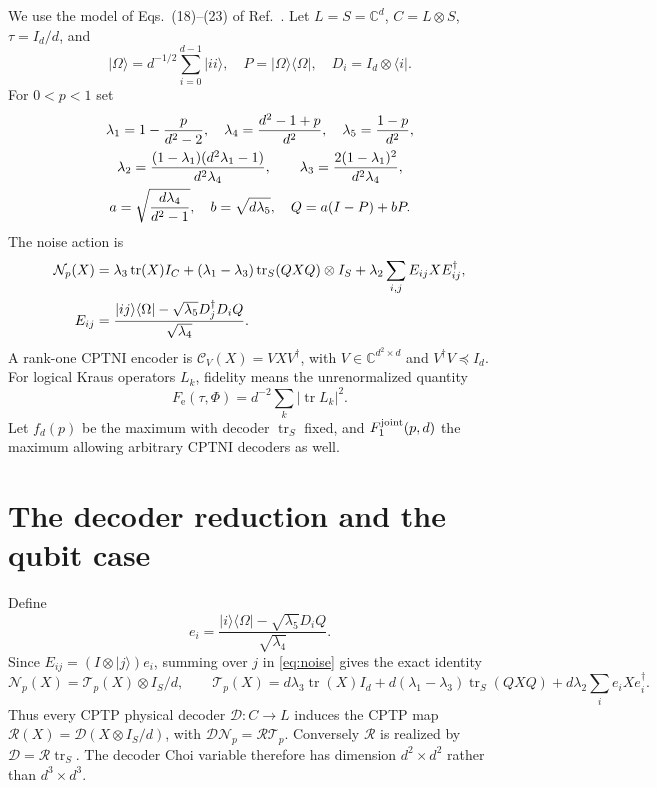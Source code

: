 \documentclass[11pt]{article}
\newcommand{\tr}{\operatorname{tr}}
\newcommand{\ket}[1]{\lvert#1\rangle}
\newcommand{\bra}[1]{\langle#1\rvert}
\newcommand{\N}{\mathcal N}
\newcommand{\T}{\mathcal T}
\newcommand{\R}{\mathcal R}
\newcommand{\C}{\mathcal C}
\newcommand{\F}{F_{\mathrm e}}
\begin{document}
We use the model of Eqs.~(18)--(23) of Ref.~\cite{LiJiang}. Let
$L=S=\mathbb C^d$, $C=L\otimes S$, $\tau=I_d/d$, and
\[
 \ket\Omega=d^{-1/2}\sum_{i=0}^{d-1}\ket{ii},\quad
 P=\ket\Omega\bra\Omega,\quad D_i=I_d\otimes\bra i.
\]
For $0<p<1$ set
\begin{gather}
 \lambda_1=1-\frac p{d^2-2},\quad
 \lambda_4=\frac{d^2-1+p}{d^2},\quad\lambda_5=\frac{1-p}{d^2},\notag\\
 \lambda_2=\frac{(1-\lambda_1)(d^2\lambda_1-1)}{d^2\lambda_4},\qquad
 \lambda_3=\frac{2(1-\lambda_1)^2}{d^2\lambda_4},\notag\\
 a=\sqrt{\frac{d\lambda_4}{d^2-1}},\quad b=\sqrt{d\lambda_5},\quad
 Q=a(I-P)+bP.\label{eq:parameters}
\end{gather}
The noise action is
\begin{align}
 \N_p(X)&=\lambda_3\tr(X)I_C+
 (\lambda_1-\lambda_3)\tr_S(QXQ)\otimes I_S
 +\lambda_2\sum_{i,j}E_{ij}XE_{ij}^\dagger,\label{eq:noise}\\
 E_{ij}&=\frac{\ket{ij}\bra\Omega-\sqrt{\lambda_5}D_j^\dagger D_iQ}
 {\sqrt{\lambda_4}}.\notag
\end{align}
A rank-one CPTNI encoder is $\C_V(X)=VXV^\dagger$, with
$V\in\mathbb C^{d^2\times d}$ and $V^\dagger V\preceq I_d$.
For logical Kraus operators $L_k$, fidelity means the unrenormalized quantity
\begin{equation}\label{eq:fidelity}
 \F(\tau,\Phi)=d^{-2}\sum_k|\tr L_k|^2.
\end{equation}
Let $f_d(p)$ be the maximum with decoder $\tr_S$ fixed, and $F_1^{\rm joint}(p,d)$
the maximum allowing arbitrary CPTNI decoders as well.

\section{The decoder reduction and the qubit case}
Define
\[
 e_i=\frac{\ket i\bra\Omega-\sqrt{\lambda_5}D_iQ}{\sqrt{\lambda_4}}.
\]
Since $E_{ij}=(I\otimes\ket j)e_i$, summing over $j$ in
\eqref{eq:noise} gives the exact identity
\begin{equation}\label{eq:factorization}
 \N_p(X)=\T_p(X)\otimes I_S/d,\qquad
 \T_p(X)=d\lambda_3\tr(X)I_d+
 d(\lambda_1-\lambda_3)\tr_S(QXQ)+d\lambda_2\sum_i e_iXe_i^\dagger.
\end{equation}
Thus every CPTP physical decoder $\mathcal D:C\to L$ induces the CPTP
map $\R(X)=\mathcal D(X\otimes I_S/d)$, with
$\mathcal D\N_p=\R\T_p$. Conversely $\R$ is realized by
$\mathcal D=\R\tr_S$. The decoder Choi variable therefore has dimension
$d^2\times d^2$ rather than $d^3\times d^3$.
\end{document}
